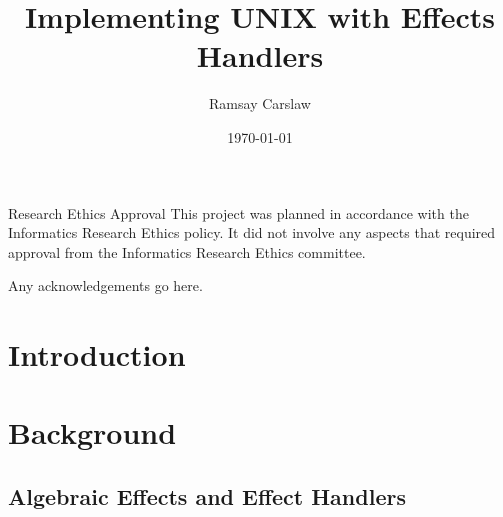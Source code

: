 \documentclass[logo,bsc,singlespacing,parskip]{infthesis}
\begin{document}
\begin{preliminary}

\title{Implementing UNIX with Effects Handlers}
\author{Ramsay Carslaw}


\date{\today}


\maketitle

\newenvironment{ethics}
   {\begin{frontenv}{Research Ethics Approval}{\LARGE}}
   {\end{frontenv}\newpage}

\begin{ethics}
This project was planned in accordance with the Informatics Research
Ethics policy. It did not involve any aspects that required approval
from the Informatics Research Ethics committee.

\standarddeclaration
\end{ethics}

\begin{acknowledgements}
  Any acknowledgements go here.
\end{acknowledgements}

\tableofcontents

\end{preliminary}

\chapter{Introduction}

\chapter{Background}

\section{Algebraic Effects and Effect Handlers}
\end{document}
